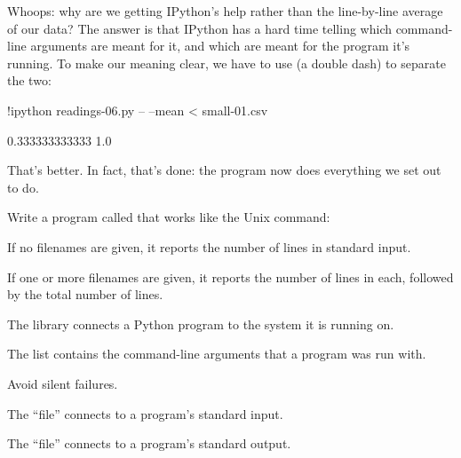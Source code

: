 Whoops: why are we getting IPython's help rather than the line-by-line
average of our data? The answer is that IPython has a hard time telling
which command-line arguments are meant for it, and which are meant for
the program it's running. To make our meaning clear, we have to use
\code{-{}-} (a double dash) to separate the two:

\begin{VerbIn}
!ipython readings-06.py -- --mean < small-01.csv
\end{VerbIn}

\begin{VerbOut}
0.333333333333
1.0
\end{VerbOut}

That's better. In fact, that's done: the program now does everything we
set out to do.

\begin{challenge}
  Write a program called  that works like the Unix
   command:

  \begin{swcitemize}
  \item
    If no filenames are given, it reports the number of lines in
    standard input.
  \item
    If one or more filenames are given, it reports the number of lines
    in each, followed by the total number of lines.
   \end{swcitemize}
\end{challenge}

\begin{keypoints}
\begin{swcitemize}
\item
  The  library connects a Python program to the system it is
  running on.
\item
  The list  contains the command-line arguments that a
  program was run with.
\item
  Avoid silent failures.
\item
  The ``file''  connects to a program's standard
  input.
\item
  The ``file''  connects to a program's standard
  output.
\end{swcitemize}
\end{keypoints}
